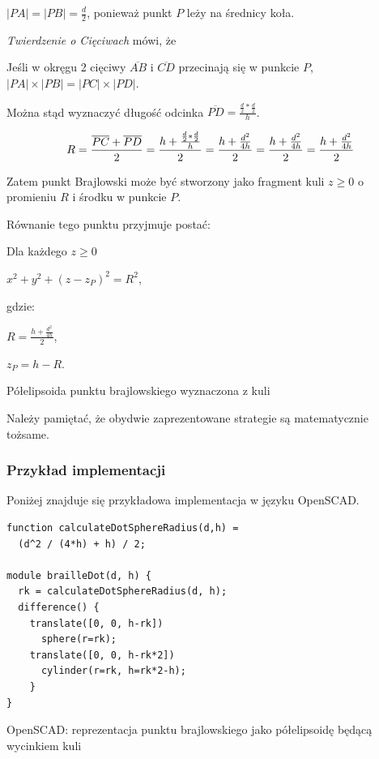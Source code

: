 \documentclass[12pt,a4paper]{article}
\begin{document}
$ \left| PA \right| = \left| PB \right| = \frac{d}{2}$, ponieważ punkt $P$ leży na średnicy koła.

\emph{Twierdzenie o Cięciwach} \cite{chords} mówi, że

Jeśli w okręgu 2 cięciwy $\overline{AB}$ i $\overline{CD}$ przecinają się w punkcie $P$,
$ \left|PA\right| \times \left| PB \right| = \left| PC \right| \times \left| PD \right| $.

Można stąd wyznaczyć długość odcinka
$\overline{PD} = \frac{\frac{d}{2} * \frac{d}{2}}{h}$.

$$
R = \frac{\overline{PC} + \overline{PD}}{2} =
\frac{h + \frac{\frac{d}{2} * \frac{d}{2}}{h}}{2} = \\
\frac{h + \frac{d^2}{4h}}{2} = \\
\frac{h + \frac{d^2}{4h}}{2} = \\
\frac{h + \frac{d^2}{4h}}{2}
$$

Zatem punkt Brajlowski może być stworzony jako fragment kuli $z \geq 0$ o promieniu $R$ i środku w punkcie $P$.

Równanie tego punktu przyjmuje postać:

\begin{feq}
Dla każdego $z \geq 0$

$x^2 + y^2 + (z - z_P)^2 = R^2$,

gdzie:

$R = \frac{h + \frac{d^2}{4h}}{2}$,

$z_P = h-R$.
\caption{Półelipsoida punktu brajlowskiego wyznaczona z kuli}
\label{eq:ellipsoidsphere}
\end{feq}

Należy pamiętać, że obydwie zaprezentowane strategie są matematycznie tożsame.

\subsubsection{Przykład implementacji}
Poniżej znajduje się przykładowa implementacja w języku OpenSCAD.

\begin{code}
\begin{verbatim}
function calculateDotSphereRadius(d,h) = 
  (d^2 / (4*h) + h) / 2;

module brailleDot(d, h) {
  rk = calculateDotSphereRadius(d, h);
  difference() {
    translate([0, 0, h-rk])
      sphere(r=rk);
    translate([0, 0, h-rk*2])
      cylinder(r=rk, h=rk*2-h);
    }
}
\end{verbatim}
\caption{OpenSCAD: reprezentacja punktu brajlowskiego jako półelipsoidę będącą wycinkiem kuli}
\end{code}
\end{document}
